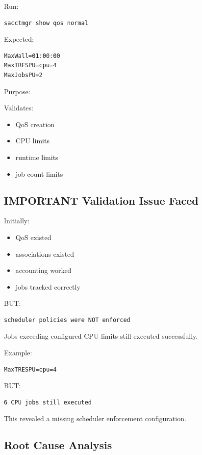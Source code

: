 \documentclass[11pt]{article}
\begin{document}
Run:

\begin{verbatim}
sacctmgr show qos normal
\end{verbatim}

Expected:

\begin{verbatim}
MaxWall=01:00:00
MaxTRESPU=cpu=4
MaxJobsPU=2
\end{verbatim}

Purpose:

Validates:

\begin{itemize}
\item QoS creation
\item CPU limits
\item runtime limits
\item job count limits
\end{itemize}
\subsection{IMPORTANT Validation Issue Faced}
\label{sec:org179ea5e}

Initially:

\begin{itemize}
\item QoS existed
\item associations existed
\item accounting worked
\item jobs tracked correctly
\end{itemize}

BUT:

\begin{verbatim}
scheduler policies were NOT enforced
\end{verbatim}

Jobs exceeding configured CPU limits still executed successfully.

Example:

\begin{verbatim}
MaxTRESPU=cpu=4
\end{verbatim}

BUT:

\begin{verbatim}
6 CPU jobs still executed
\end{verbatim}

This revealed a missing scheduler enforcement configuration.
\subsection{Root Cause Analysis}
\label{sec:orgbb73400}
\end{document}
